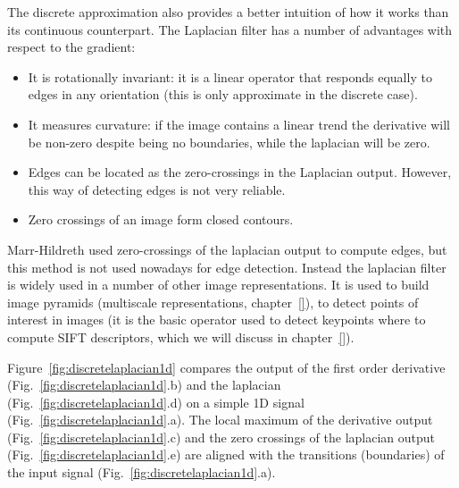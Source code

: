 The discrete approximation also provides a better intuition of how it works than its continuous counterpart. The Laplacian filter has a number of advantages with respect to the gradient:
\begin{itemize}
\item It is rotationally invariant: it is a linear operator that responds equally to edges in any orientation (this is only approximate in the discrete case). 
\item It measures curvature: if the image contains a linear trend the derivative will be non-zero despite being no boundaries, while the laplacian will be zero. 
\item Edges can be located as the zero-crossings in the Laplacian output. However, this way of detecting edges is not very reliable.
\item Zero crossings of an image form closed contours.
\end{itemize}

Marr-Hildreth \cite{} used zero-crossings of the laplacian output to compute edges, but this method is not used nowadays for edge detection. Instead the laplacian filter is widely used in a number of other image representations. It is used to build image pyramids (multiscale representations, chapter~\ref{}), to detect points of interest in images (it is the basic operator used to detect keypoints where to compute SIFT descriptors, which we will discuss in chapter~\ref{}). 

Figure~\ref{fig:discretelaplacian1d} compares the output of the first order derivative (Fig.~\ref{fig:discretelaplacian1d}.b) and the laplacian (Fig.~\ref{fig:discretelaplacian1d}.d) on a simple 1D signal (Fig.~\ref{fig:discretelaplacian1d}.a). The local maximum of the derivative output (Fig.~\ref{fig:discretelaplacian1d}.c) and the zero crossings of the laplacian output (Fig.~\ref{fig:discretelaplacian1d}.e) are aligned with the transitions (boundaries) of the input signal (Fig.~\ref{fig:discretelaplacian1d}.a).

